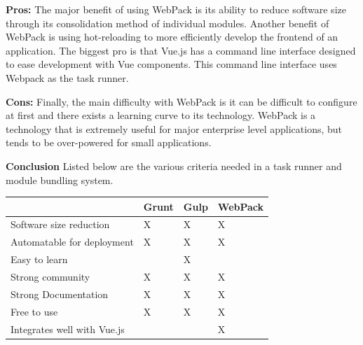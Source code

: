 \documentclass[draftclsnofoot,onecolumn,letterpaper,10pt]{IEEEtran}
\begin{document}
\begin{itemize}
					\textbf{Pros:}
						The major benefit of using WebPack is its ability to reduce software size through its consolidation method of individual modules.
						Another benefit of WebPack is using hot-reloading to more efficiently develop the frontend of an application\cite{TaskRunners}.
						The biggest pro is that Vue.js has a command line interface designed to ease development with Vue components.
						This command line interface uses Webpack as the task runner.

					\textbf{Cons:}
						Finally, the main difficulty with WebPack is it can be difficult to configure at first and there exists a learning curve to its technology\cite{TaskRunners}.
						WebPack is a technology that is extremely useful for major enterprise level applications, but tends to be over-powered for small applications.

			\end{itemize}


			\textbf{Conclusion}
					Listed below are the various criteria needed in a task runner and module bundling system.

			\begin{center}
							\begin{tabular}{| m{15em} | m{10em} | m{10em} | m{10em} |}
									\hline
											& Grunt & Gulp & WebPack \\

									\hline
											Software size reduction & X & X & X \\

									\hline
											Automatable for deployment & X & X & X \\

									\hline
											Easy to learn &  & X &  \\

									\hline
											Strong community & X & X & X \\

									\hline
											Strong Documentation & X & X & X \\

									\hline
											Free to use & X & X & X \\

									\hline
											Integrates well with Vue.js &  &  & X \\

									\hline
							\end{tabular}
					\end{center}
\end{document}
